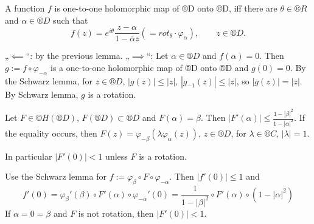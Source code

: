 \documentclass[12pt]{article}					%
\begin{document}
\begin{veta}
	A function $f$ is one-to-one holomorphic map of ®D onto ®D, iff there are $θ \in ®R$ and $α \in ®D$ such that
	$$ f(z) = e^{iθ}\frac{z - α}{1 - \overline{α}z} (= rot_θ · φ_α), \qquad z \in ®D. $$

	\begin{dukazin}
		„$\impliedby$“: by the previous lemma. „$\implies$“: Let $α \in ®D$ and $f(α) = 0$. Then $g := f \circ φ_{-α}$ is a one-to-one holomorphic map of ®D onto ®D and $g(0) = 0$. By the Schwarz lemma, for $z \in ®D$, $|g(z)| ≤ |z|$, $|g_{-1}(z)| ≤ |z|$, so $|g(z)| = |z|$. By Schwarz lemma, $g$ is a rotation.
	\end{dukazin}
\end{veta}

\begin{lemma}
	Let $F \in ©H(®D)$, $F(®D) \subset ®D$ and $F(α) = β$. Then $|F'(α)| ≤ \frac{1 - |β|^2}{1 - |α|^2}$. If the equality occurs, then $F(z) = φ_{-β}(λ φ_α(z))$, $z \in ®D$, for $λ \in ®C$, $|λ| = 1$.

	In particular $|F'(0)| < 1$ unless $F$ is a rotation.

	\begin{dukazin}
		Use the Schwarz lemma for $f := φ_β ∘ F ∘ φ_{-α}$. Then $|f'(0)| ≤ 1$ and
		$$ f'(0) = φ_β'(β)∘F'(α)∘φ_{-α}'(0) = \frac{1}{1 - |β|^2} ∘ F'(α) ∘ (1 - |α|^2) $$
		If $α = 0 = β$ and $F$ is not rotation, then $|F'(0)| < 1$.
	\end{dukazin}
\end{lemma}
\end{document}
